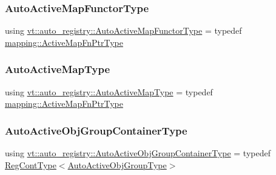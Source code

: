 \mbox{\label{namespacevt_1_1auto__registry_ab095554f67e143f84fe337bd85affde5}} 
\subsubsection{\texorpdfstring{Auto\+Active\+Map\+Functor\+Type}{AutoActiveMapFunctorType}}
{\footnotesize\ttfamily using \hyperlink{namespacevt_1_1auto__registry_ab095554f67e143f84fe337bd85affde5}{vt\+::auto\+\_\+registry\+::\+Auto\+Active\+Map\+Functor\+Type} = typedef \hyperlink{namespacevt_1_1mapping_a748d5efb71ca5878288d5809f57d7254}{mapping\+::\+Active\+Map\+Fn\+Ptr\+Type}}

\mbox{\label{namespacevt_1_1auto__registry_a03898a246ff1a8ce8ee4071a0391b386}} 
\subsubsection{\texorpdfstring{Auto\+Active\+Map\+Type}{AutoActiveMapType}}
{\footnotesize\ttfamily using \hyperlink{namespacevt_1_1auto__registry_a03898a246ff1a8ce8ee4071a0391b386}{vt\+::auto\+\_\+registry\+::\+Auto\+Active\+Map\+Type} = typedef \hyperlink{namespacevt_1_1mapping_a748d5efb71ca5878288d5809f57d7254}{mapping\+::\+Active\+Map\+Fn\+Ptr\+Type}}

\mbox{\label{namespacevt_1_1auto__registry_a2328b4aa12baaa0b0fc0bf07ed2be755}} 
\subsubsection{\texorpdfstring{Auto\+Active\+Obj\+Group\+Container\+Type}{AutoActiveObjGroupContainerType}}
{\footnotesize\ttfamily using \hyperlink{namespacevt_1_1auto__registry_a2328b4aa12baaa0b0fc0bf07ed2be755}{vt\+::auto\+\_\+registry\+::\+Auto\+Active\+Obj\+Group\+Container\+Type} = typedef \hyperlink{namespacevt_1_1auto__registry_a988a4943e4c8fe82b56f5b13bddceb2b}{Reg\+Cont\+Type}$<$\hyperlink{namespacevt_1_1auto__registry_a861d9d01e89c81f0a955188724aa25b3}{Auto\+Active\+Obj\+Group\+Type}$>$}

